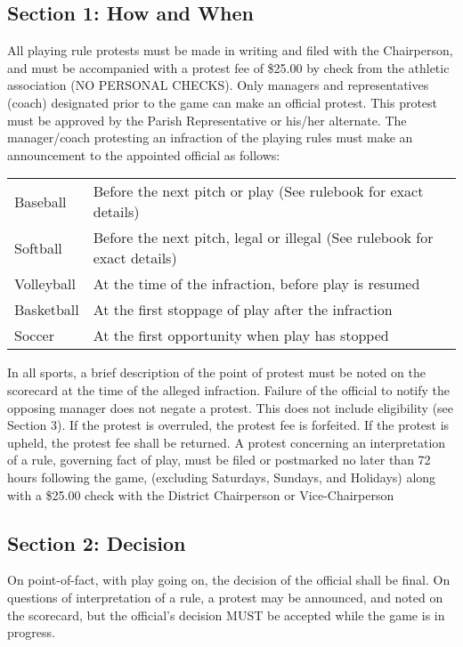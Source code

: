 \documentclass[10pt,oneside,draft]{memoir}
\begin{document}
\subsection{Section 1: How and When}
All playing rule protests must be made in writing and filed with the Chairperson, and must be accompanied with a protest fee of \$25.00 by check from the athletic association (NO PERSONAL CHECKS).  Only managers and representatives (coach) designated prior to the game can make an official protest.  This protest must be approved by the Parish Representative or his/her alternate.  The manager/coach protesting an infraction of the playing rules must make an announcement to the appointed official as follows:
\begin{center}
    \begin{tabular}{l l}
        Baseball & Before the next pitch or play (See rulebook for exact details) \\
        Softball & Before the next pitch, legal or illegal (See rulebook for exact details) \\
        Volleyball & At the time of the infraction, before play is resumed \\
        Basketball & At the first stoppage of play after the infraction \\
        Soccer & At the first opportunity when play has stopped \\
    \end{tabular}
\end{center}

In all sports, a brief description of the point of protest must be noted on the scorecard at the time of the alleged infraction.  Failure of the official to notify the opposing manager does not negate a protest.   This does not include eligibility (see Section 3).  If the protest is overruled, the protest fee is forfeited. If the protest is upheld, the protest fee shall be returned. A protest concerning an interpretation of a rule, governing fact of play, must be filed or postmarked no later than 72 hours following the game, (excluding Saturdays, Sundays, and Holidays) along with a \$25.00 check with the District Chairperson or Vice-Chairperson 

\subsection{Section 2: Decision}
On point-of-fact, with play going on, the decision of the official shall be final.  On questions of interpretation of a rule, a protest may be announced, and noted on the scorecard, but the official's decision MUST be accepted while the game is in progress.
\end{document}
